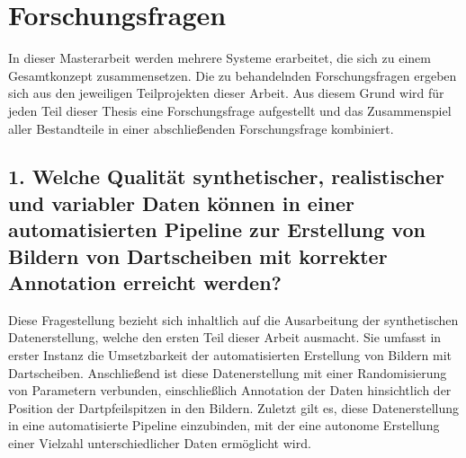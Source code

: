 


\section{Forschungsfragen}
\label{sec:forschungsfragen}

In dieser Masterarbeit werden mehrere Systeme erarbeitet, die sich zu einem Gesamtkonzept zusammensetzen. Die zu behandelnden Forschungsfragen ergeben sich aus den jeweiligen Teilprojekten dieser Arbeit. Aus diesem Grund wird für jeden Teil dieser Thesis eine Forschungsfrage aufgestellt und das Zusammenspiel aller Bestandteile in einer abschließenden Forschungsfrage kombiniert.

\subsection*{1. Welche Qualität synthetischer, realistischer und variabler Daten können in einer automatisierten Pipeline zur Erstellung von Bildern von Dartscheiben mit korrekter Annotation erreicht werden?}

Diese Fragestellung bezieht sich inhaltlich auf die Ausarbeitung der synthetischen Datenerstellung, welche den ersten Teil dieser Arbeit ausmacht. Sie umfasst in erster Instanz die Umsetzbarkeit der automatisierten Erstellung von Bildern mit Dartscheiben. Anschließend ist diese Datenerstellung mit einer Randomisierung von Parametern verbunden, einschließlich Annotation der Daten hinsichtlich der Position der Dartpfeilspitzen in den Bildern. Zuletzt gilt es, diese Datenerstellung in eine automatisierte Pipeline einzubinden, mit der eine autonome Erstellung einer Vielzahl unterschiedlicher Daten ermöglicht wird.

